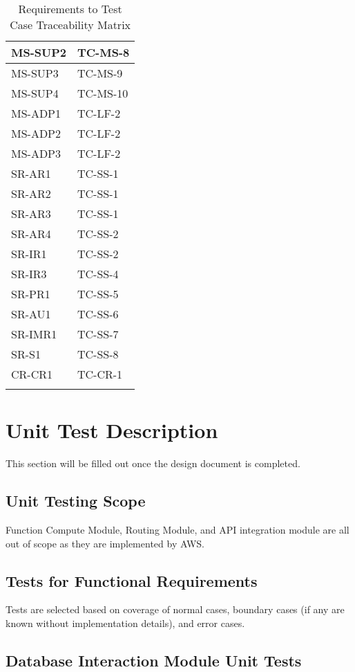 \documentclass[12pt, titlepage]{article}
\begin{document}
\begin{longtable}{|l|l|}
  MS-SUP2 & TC-MS-8 \\ \hline
  MS-SUP3 & TC-MS-9 \\ \hline
  MS-SUP4 & TC-MS-10 \\ \hline
  MS-ADP1 & TC-LF-2 \\ \hline
  MS-ADP2 & TC-LF-2 \\ \hline
  MS-ADP3 & TC-LF-2 \\ \hline
  SR-AR1 & TC-SS-1 \\ \hline
  SR-AR2 & TC-SS-1 \\ \hline
  SR-AR3 & TC-SS-1 \\ \hline
  SR-AR4 & TC-SS-2 \\ \hline
  SR-IR1 & TC-SS-2 \\ \hline
  SR-IR3 & TC-SS-4 \\ \hline
  SR-PR1 & TC-SS-5\\ \hline
  SR-AU1 & TC-SS-6 \\ \hline
  SR-IMR1 & TC-SS-7 \\ \hline
  SR-S1 & TC-SS-8 \\ \hline
  CR-CR1 & TC-CR-1 \\ \hline
  \caption{Requirements to Test Case Traceability Matrix}
\end{longtable}

\section{Unit Test Description}

This section will be filled out once the design document is completed.

\subsection{Unit Testing Scope}

Function Compute Module, Routing Module, and API integration module are all
out of scope as they are implemented by AWS.

\subsection{Tests for Functional Requirements}

Tests are selected based on coverage of normal cases, boundary cases
(if any are known without implementation details), and error cases.

\subsection{Database Interaction Module Unit Tests}
\end{document}
